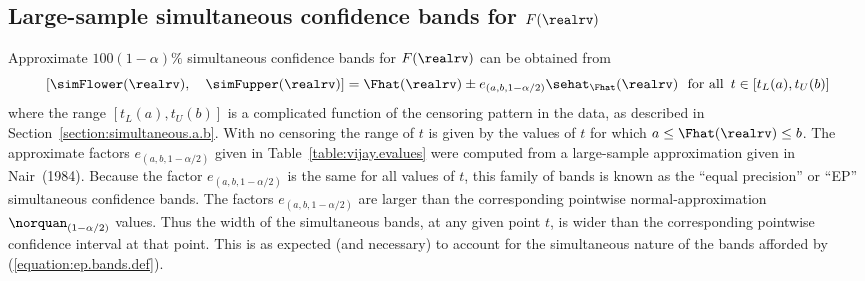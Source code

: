 \subsection{Large-sample simultaneous confidence 
bands for $F(\realrv)$}
Approximate $100 (1-\alpha)\%$ simultaneous confidence bands
for $F(\realrv)$ can be obtained from 
\begin{equation}
\label{equation:ep.bands.def}
 \left[\simFlower(\realrv), \quad \simFupper(\realrv) \right] = 
	\Fhat(\realrv) \pm e_{(a, b, 1-\alpha/2)} 
\sehat_{\Fhat}(\realrv) \,\,\,\,\mbox{for all}\,\,\, t \in[t_{L}(a),t_{U}(b)]
\end{equation}
where the range $[t_{L}(a),t_{U}(b)]$ is a complicated function of the
censoring pattern in the data, as described in
Section~\ref{section:simultaneous.a.b}.  With no
censoring the
range of $t$ is given by the values of $t$ for which $a
\leq \Fhat(\realrv) \leq b$.  The approximate factors $e_{(a, b,
1-\alpha/2)}$ given in Table~\ref{table:vijay.evalues} were computed
from a large-sample approximation given in Nair~(1984). Because the
factor $e_{(a, b, 1-\alpha/2)}$ is the same for all values of $t$,
this family of bands is known as the ``equal precision'' or ``EP''
simultaneous confidence bands. The factors $e_{(a, b, 1-\alpha/2)}$
are larger than the corresponding pointwise normal-approximation
$\norquan_{(1-\alpha/2)}$ values. Thus the width of the simultaneous
bands, at any given point $t$, is wider than the corresponding
pointwise confidence interval at that point. This is as expected (and
necessary) to account for the simultaneous nature of the bands
afforded by (\ref{equation:ep.bands.def}).

